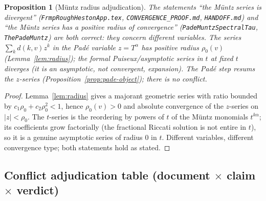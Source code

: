 \documentclass[11pt]{article}
\theoremstyle{plain}
\newtheorem{proposition}[theorem]{Proposition}
\theoremstyle{definition}
\theoremstyle{remark}
\begin{document}
\begin{proposition}[Müntz radius adjudication]\label{prop:muntz-divergence}
The statements ``the Müntz series is divergent'' (\texttt{FrmpRoughHestonApp.tex},
\texttt{CONVERGENCE\_PROOF.md}, \texttt{HANDOFF.md}) and ``the Müntz series has a
positive radius of convergence'' (\texttt{PadeMuntzSpectralTau},
\texttt{ThePadeMuntz}) are \emph{both correct}: they concern different variables.
The series $\sum_k d(k,v)z^k$ in the Padé variable $z=T^\alpha$ has positive radius
$\rho_0(v)$ (Lemma~\ref{lem:radius}); the formal Puiseux/asymptotic series in $t$ at
fixed $t$ diverges (it is an asymptotic, not convergent, expansion). The Padé step
resums the $z$-series (Proposition~\ref{prop:pade-object}); there is no conflict.
\end{proposition}
\begin{proof}
Lemma~\ref{lem:radius} gives a majorant geometric series with ratio bounded by
$c_1\rho_0+c_2\rho_0^2<1$, hence $\rho_0(v)>0$ and absolute convergence of the
$z$-series on $|z|<\rho_0$. The $t$-series is the reordering by powers of $t$ of the
Müntz monomials $t^{k\alpha}$; its coefficients grow factorially (the fractional
Riccati solution is not entire in $t$), so it is a genuine asymptotic series of
radius $0$ in $t$. Different variables, different convergence type; both statements
hold as stated. 
\end{proof}

\subsection*{Conflict adjudication table (document $\times$ claim $\times$ verdict)}
\end{document}
